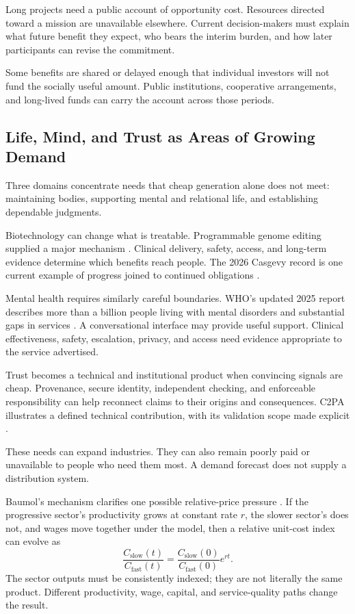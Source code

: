 Long projects need a public account of opportunity cost. Resources directed toward a mission are unavailable elsewhere. Current decision-makers must explain what future benefit they expect, who bears the interim burden, and how later participants can revise the commitment.

Some benefits are shared or delayed enough that individual investors will not fund the socially useful amount. Public institutions, cooperative arrangements, and long-lived funds can carry the account across those periods.

\subsection{Life, Mind, and Trust as Areas of Growing Demand}

Three domains concentrate needs that cheap generation alone does not meet: maintaining bodies, supporting mental and relational life, and establishing dependable judgments.

Biotechnology can change what is treatable. Programmable genome editing supplied a major mechanism \cite{jinek2012programmable}. Clinical delivery, safety, access, and long-term evidence determine which benefits reach people. The 2026 Casgevy record is one current example of progress joined to continued obligations \cite{fda2026casgevy}.

Mental health requires similarly careful boundaries. WHO's updated 2025 report describes more than a billion people living with mental disorders and substantial gaps in services \cite{who2025mental}. A conversational interface may provide useful support. Clinical effectiveness, safety, escalation, privacy, and access need evidence appropriate to the service advertised.

Trust becomes a technical and institutional product when convincing signals are cheap. Provenance, secure identity, independent checking, and enforceable responsibility can help reconnect claims to their origins and consequences. C2PA illustrates a defined technical contribution, with its validation scope made explicit \cite{c2pa2026spec}.

These needs can expand industries. They can also remain poorly paid or unavailable to people who need them most. A demand forecast does not supply a distribution system.

Baumol's mechanism clarifies one possible relative-price pressure \cite{baumol1967macro}. If the progressive sector's productivity grows at constant rate $r$, the slower sector's does not, and wages move together under the model, then a relative unit-cost index can evolve as
\begin{equation}
 \frac{C_{\mathrm{slow}}(t)}{C_{\mathrm{fast}}(t)}
 =
 \frac{C_{\mathrm{slow}}(0)}{C_{\mathrm{fast}}(0)}
 e^{rt}.
\end{equation}
The sector outputs must be consistently indexed; they are not literally the same product. Different productivity, wage, capital, and service-quality paths change the result.

